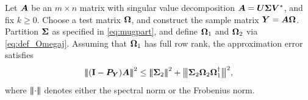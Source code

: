 \documentclass[final]{siamltex}
\newcounter{algorithm}[section]
\begin{document}


\lsp

\begin{theorem} \label{thm:main-error-bd} %
Let $\bm{A}$ be an $m\times n$ matrix with singular value decomposition
$\bm{A} = \bm{U\Sigma V}^*$, and fix $k \geq 0$.  Choose a
test matrix $\bm{\Omega}$, and construct the sample matrix $\bm{Y}
= \bm{A\Omega}$. Partition $\bm{\Sigma}$ as specified
in \eqref{eq:mugpart}, and define $\bm{\Omega}_1$ and $\bm{\Omega}_2$
via \eqref{eq:def_Omegaj}.  Assuming that $\bm{\Omega}_1$ has
full row rank, the approximation error satisfies
\begin{equation}
\label{eq:main-error-bd}
\triplenorm{ (\Id - \mtx{P}_{\mtx{Y}}) \mtx{A} }^2
    \leq \triplenorm{\mtx{\Sigma}_2}^2 + \smtriplenorm{\mtx{\Sigma}_2\mtx{\Omega}_2 \mtx{\Omega}_1^\psinv}^2,
\end{equation}
where $\left\vert\!\left\vert\!\left\vert {\cdot} \right\vert\!\right\vert\!\right\vert$ denotes either the spectral norm or the
Frobenius norm.
\end{theorem}



\end{document}
